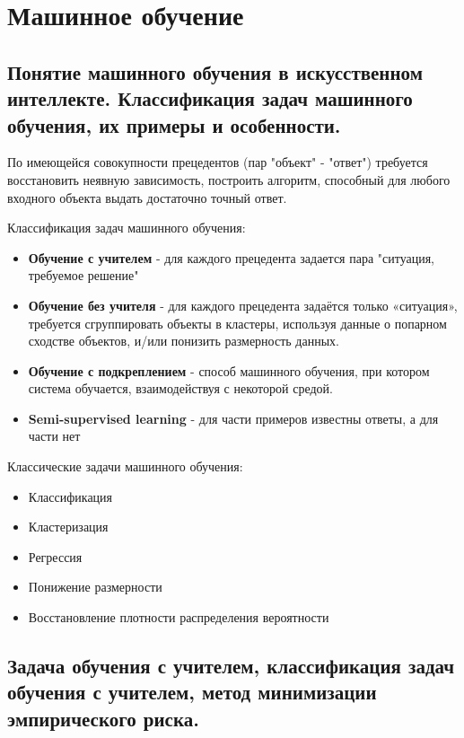 \documentclass{article}
\begin{document}
\section{Машинное обучение}

\subsection{Понятие машинного обучения в искусственном интеллекте. Классификация задач
машинного обучения, их примеры и особенности.}


По имеющейся совокупности прецедентов (пар "объект" - "ответ") требуется
восстановить неявную зависимость, построить алгоритм, способный для любого
входного объекта выдать достаточно точный ответ.

Классификация задач машинного обучения:
\begin{itemize}
    \item \textbf{Обучение с учителем} - для каждого прецедента задается пара "ситуация, требуемое решение"
    \item \textbf{Обучение без учителя} - для каждого прецедента задаётся только
    «ситуация», требуется сгруппировать объекты в кластеры, используя данные
    о попарном сходстве объектов, и/или понизить размерность данных.
    \item \textbf{Обучение с подкреплением} - способ машинного обучения, при котором
    система обучается, взаимодействуя с некоторой средой.
    \item \textbf{Semi-supervised learning} - для части примеров известны ответы, а для части нет
\end{itemize}

Классические задачи машинного обучения:
\begin{itemize}
    \item Классификация
    \item Кластеризация
    \item Регрессия
    \item Понижение размерности
    \item Восстановление плотности распределения вероятности
\end{itemize}

\subsection{Задача обучения с учителем, классификация задач обучения с учителем, метод
минимизации эмпирического риска.}
\end{document}
